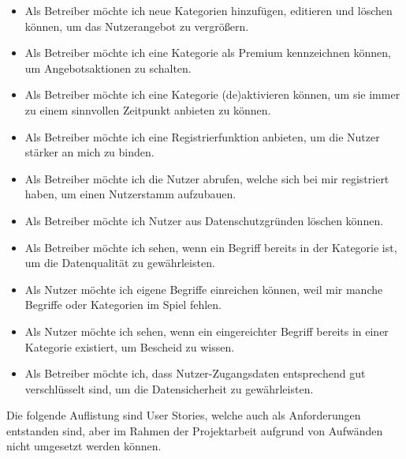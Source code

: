 {\begin{itemize}
	\item Als Betreiber möchte ich neue Kategorien hinzufügen, editieren und löschen können, um das Nutzerangebot zu vergrößern.
	\item Als Betreiber möchte ich eine Kategorie als Premium kennzeichnen können, um Angebotsaktionen zu schalten.
	\item Als Betreiber möchte ich eine Kategorie (de)aktivieren können, um sie immer zu einem sinnvollen Zeitpunkt anbieten zu können.
	\item Als Betreiber möchte ich eine Registrierfunktion anbieten, um die Nutzer stärker an mich zu binden.
	\item Als Betreiber möchte ich die Nutzer abrufen, welche sich bei mir registriert haben, um einen Nutzerstamm aufzubauen.
	\item Als Betreiber möchte ich Nutzer aus Datenschutzgründen löschen können.
	\item Als Betreiber möchte ich sehen, wenn ein Begriff bereits in der Kategorie ist, um die Datenqualität zu gewährleisten.
	\item Als Nutzer möchte ich eigene Begriffe einreichen können, weil mir manche Begriffe oder Kategorien im Spiel fehlen.
	\item Als Nutzer möchte ich sehen, wenn ein eingereichter Begriff bereits in einer Kategorie existiert, um Bescheid zu wissen.	
	\item Als Betreiber möchte ich, dass Nutzer-Zugangsdaten entsprechend gut verschlüsselt sind, um die Datensicherheit zu gewährleisten.
\end{itemize}

Die folgende Auflistung sind User Stories, welche auch als Anforderungen entstanden sind, aber im Rahmen der Projektarbeit aufgrund von Aufwänden nicht umgesetzt werden können.

}
